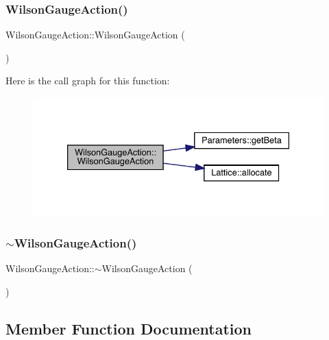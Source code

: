 \subsubsection{\texorpdfstring{WilsonGaugeAction()}{WilsonGaugeAction()}}
{\footnotesize\ttfamily Wilson\+Gauge\+Action\+::\+Wilson\+Gauge\+Action (\begin{DoxyParamCaption}{ }\end{DoxyParamCaption})}

Here is the call graph for this function\+:\nopagebreak
\begin{figure}[H]
\begin{center}
\leavevmode
\includegraphics[width=333pt]{class_wilson_gauge_action_a50d06446cf93f7e738e88c372920f518_cgraph}
\end{center}
\end{figure}
\mbox{\label{class_wilson_gauge_action_a0995cd407b76b4f5d035659718591c11}} 
\subsubsection{\texorpdfstring{$\sim$WilsonGaugeAction()}{~WilsonGaugeAction()}}
{\footnotesize\ttfamily Wilson\+Gauge\+Action\+::$\sim$\+Wilson\+Gauge\+Action (\begin{DoxyParamCaption}{ }\end{DoxyParamCaption})}



\subsection{Member Function Documentation}
\mbox{\label{class_wilson_gauge_action_af1f6ba42fcc2b923dc3b37bf150bfae9}} 
